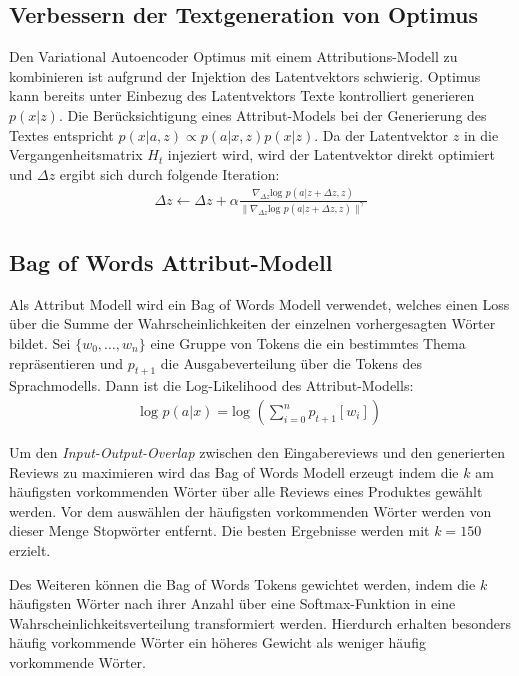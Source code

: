 \subsection{Verbessern der Textgeneration von Optimus}
Den Variational Autoencoder Optimus mit einem Attributions-Modell zu kombinieren ist aufgrund der Injektion des Latentvektors schwierig.
Optimus kann bereits unter Einbezug des Latentvektors Texte kontrolliert generieren $p(x|z)$.
Die Berücksichtigung eines Attribut-Models bei der Generierung des Textes entspricht $p(x|a,z) \propto p(a|x,z)p(x|z)$.%
Da der Latentvektor $z$ in die Vergangenheitsmatrix $H_t$ injeziert wird, wird der Latentvektor direkt optimiert und $\Delta z$ ergibt sich durch folgende Iteration:
\begin{align*}
    \Delta z \leftarrow \Delta z + \alpha \frac{\nabla_{\Delta z} \text{log }p(a|z+\Delta z,z)}{\| \nabla_{\Delta z} \text{log }p(a|z+\Delta z,z)\|^\gamma}
\end{align*}

\subsection{Bag of Words Attribut-Modell}
Als Attribut Modell wird ein Bag of Words Modell verwendet, welches einen Loss über die Summe der Wahrscheinlichkeiten der einzelnen vorhergesagten Wörter bildet.
Sei $\{w_0, \ldots, w_n\}$ eine Gruppe von Tokens die ein bestimmtes Thema repräsentieren und $p_{t+1}$ die Ausgabeverteilung über die Tokens des Sprachmodells.
Dann ist die Log-Likelihood des Attribut-Modells: 
\begin{align*}
    \text{log }p(a|x) = \text{log }(\sum_{i=0}^n p_{t+1}[w_i])
\end{align*}

Um den \textit{Input-Output-Overlap} zwischen den Eingabereviews und den generierten Reviews zu maximieren wird das Bag of Words Modell erzeugt indem die $k$ am häufigsten vorkommenden Wörter über alle Reviews eines Produktes gewählt werden.
Vor dem auswählen der häufigsten vorkommenden Wörter werden von dieser Menge Stopwörter entfernt.
Die besten Ergebnisse werden mit $k=150$ erzielt. %

Des Weiteren können die Bag of Words Tokens gewichtet werden, indem die $k$ häufigsten Wörter nach ihrer Anzahl über eine Softmax-Funktion in eine Wahrscheinlichkeitsverteilung transformiert werden.
Hierdurch erhalten besonders häufig vorkommende Wörter ein höheres Gewicht als weniger häufig vorkommende Wörter.

